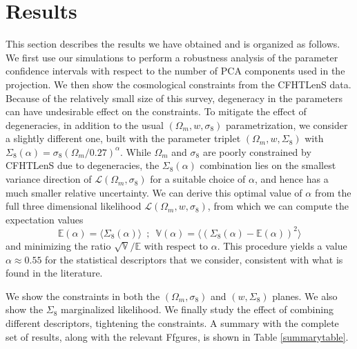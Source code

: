 \documentclass[reprint,aps,prd,superscriptaddress,showkeys,showpacs]{revtex4-1}
\begin{document}
\section{Results}
\label{results}
This section describes the results we have obtained and is organized as follows. We first use our simulations to perform a robustness analysis of the parameter confidence intervals with respect to the number of PCA components used in the projection. We then show the cosmological constraints from the CFHTLenS data. Because of the relatively small size of this survey, degeneracy in the parameters can have undesirable effect on the constraints. To mitigate the effect of degeneracies, in addition to the usual $(\Omega_m,w,\sigma_8)$ parametrization, we consider a slightly different one, built with the parameter triplet $(\Omega_m,w,\Sigma_8)$ with $\Sigma_8(\alpha)=\sigma_8(\Omega_m/0.27)^\alpha$. While $\Omega_m$ and $\sigma_8$ are poorly constrained by CFHTLenS due to degeneracies, the $\Sigma_8(\alpha)$ combination lies on the smallest variance direction of $\mathcal{L}(\Omega_m,\sigma_8)$ for a suitable choice of $\alpha$, and hence has a much smaller relative uncertainty. We can derive this optimal value of $\alpha$ from the full three dimensional likelihood $\mathcal{L}(\Omega_m,w,\sigma_8)$, from which we can compute the expectation values
\begin{equation}
\mathds{E}(\alpha) = \langle\Sigma_8(\alpha)\rangle \,\,\, ; \,\,\, \mathds{V}(\alpha) = \langle(\Sigma_8(\alpha)-\mathds{E}(\alpha))^2\rangle
\end{equation}
%
and minimizing the ratio $\sqrt{\mathds{V}}/\mathds{E}$ with respect to $\alpha$. This procedure yields a value $\alpha\approx0.55$ for the statistical descriptors that we consider, consistent  with what is found in the literature. 

We show the constraints in both the $(\Omega_m,\sigma_8)$ and $(w,\Sigma_8)$ planes. We also show the $\Sigma_8$ marginalized likelihood. We finally study the effect of combining different descriptors, tightening the constraints. A summary with the complete set of results, along with the relevant Ffgures, is shown in Table \ref{summarytable}. 

\end{document}
